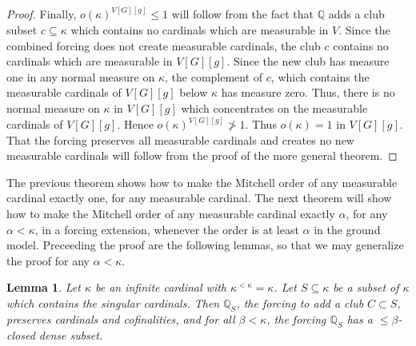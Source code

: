 \documentclass[10pt,leqno]{amsart}
\newtheorem{lemma}[theorem]{Lemma}
\begin{document}
\begin{proof}
Finally, $o(\kappa)^{V[G][g]} \le 1$ will follow from the fact that $\mathbb{Q}$ adds a club subset $c \subseteq \kappa$ which contains no cardinals which are measurable in $V$. Since the combined forcing does not create measurable cardinals, the club $c$ contains no cardinals which are measurable in $V[G][g]$. Since the new club has measure one in any normal measure on $\kappa$, the complement of $c$, which contains the measurable cardinals of $V[G][g]$ below $\kappa$ has measure zero. Thus, there is no normal measure on $\kappa$ in $V[G][g]$ which concentrates on the measurable cardinals of $V[G][g]$. Hence $o(\kappa)^{V[G][g]} \ngtr 1$. Thus $o(\kappa) = 1$ in $V[G][g]$. That the forcing preserves all measurable cardinals and creates no new measurable cardinals will follow from the proof of the more general theorem.
\end{proof}

The previous theorem shows how to make the Mitchell order of any measurable cardinal exactly one, for any measurable cardinal. The next theorem will show how to make the Mitchell order of any measurable cardinal exactly $\alpha$, for any $\alpha < \kappa$, in a forcing extension, whenever the order is at least $\alpha$ in the ground model. Preceeding the proof are the following lemmas, so that we may generalize the proof for any $\alpha < \kappa$.

\begin{lemma} Let $\kappa$ be an infinite cardinal with $\kappa^{< \kappa} = \kappa$. Let $S \subseteq \kappa$ be a subset of $\kappa$ which contains the singular cardinals. Then $\mathbb{Q}_S$, the forcing to add a club $C \subset S$, preserves cardinals and cofinalities, and for all $\beta < \kappa$, the forcing $\mathbb{Q}_S$ has a $\le \beta$-closed dense subset. 
\end{lemma}
\end{document}
